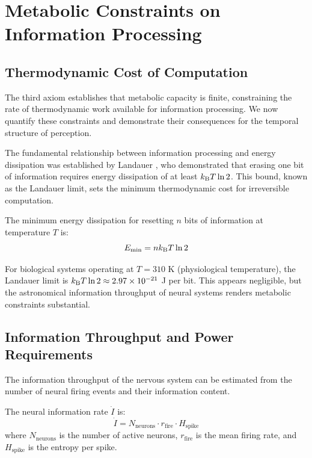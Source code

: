 \section{Metabolic Constraints on Information Processing}
\label{sec:energy}

\subsection{Thermodynamic Cost of Computation}

The third axiom establishes that metabolic capacity is finite, constraining the rate of thermodynamic work available for information processing. We now quantify these constraints and demonstrate their consequences for the temporal structure of perception.

The fundamental relationship between information processing and energy dissipation was established by Landauer \citep{landauer1961irreversibility}, who demonstrated that erasing one bit of information requires energy dissipation of at least $k_{\mathrm{B}} T \ln 2$. This bound, known as the Landauer limit, sets the minimum thermodynamic cost for irreversible computation.

\begin{theorem}
\label{thm:landauer}
The minimum energy dissipation for resetting $n$ bits of information at temperature $T$ is:
\begin{equation}
E_{\min} = n k_{\mathrm{B}} T \ln 2
\label{eq:landauer}
\end{equation}
\end{theorem}

For biological systems operating at $T = 310$ K (physiological temperature), the Landauer limit is $k_{\mathrm{B}} T \ln 2 \approx 2.97 \times 10^{-21}$ J per bit. This appears negligible, but the astronomical information throughput of neural systems renders metabolic constraints substantial.

\subsection{Information Throughput and Power Requirements}

The information throughput of the nervous system can be estimated from the number of neural firing events and their information content.

\begin{definition}
\label{def:neural_info}
The neural information rate $\dot{I}$ is:
\begin{equation}
\dot{I} = N_{\text{neurons}} \cdot r_{\text{fire}} \cdot H_{\text{spike}}
\label{eq:neural_info_rate}
\end{equation}
where $N_{\text{neurons}}$ is the number of active neurons, $r_{\text{fire}}$ is the mean firing rate, and $H_{\text{spike}}$ is the entropy per spike.
\end{definition}


